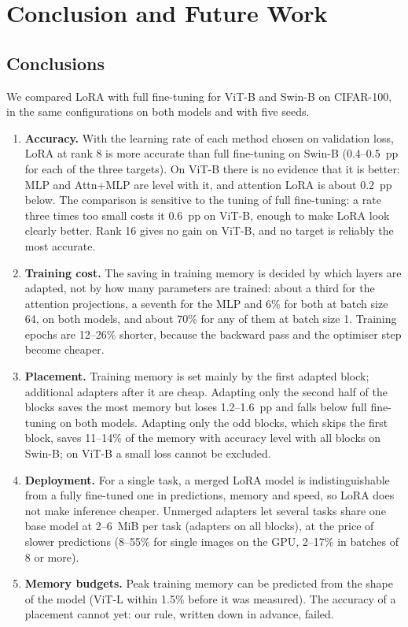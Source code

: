 \chapter{Conclusion and Future Work}
\label{ch:conclusion}

\section{Conclusions}

We compared LoRA with full fine-tuning for ViT-B and Swin-B on CIFAR-100, in the same configurations on both models
and with five seeds.

\begin{enumerate}
  \item \textbf{Accuracy.} With the learning rate of each method chosen on validation loss, LoRA at rank 8 is more
        accurate than full fine-tuning on Swin-B (0.4--0.5~pp for each of the three targets). On ViT-B there is no
        evidence that it is better: MLP and Attn+MLP are level with it, and attention LoRA is about 0.2~pp below. The comparison is sensitive to the tuning of full fine-tuning: a
        rate three times too small costs it 0.6~pp on ViT-B, enough to make LoRA look clearly better. Rank 16 gives
        no gain on ViT-B, and no target is reliably the most accurate.
  \item \textbf{Training cost.} The saving in training memory is decided by which layers are adapted, not by how
        many parameters are trained: about a third for the attention projections, a seventh for the MLP and 6\% for
        both at batch size 64, on both models, and about 70\% for any of them at batch size 1. Training epochs are
        12--26\% shorter, because the backward pass and the optimiser step become cheaper.
  \item \textbf{Placement.} Training memory is set mainly by the first adapted block; additional adapters after it
        are cheap. Adapting only the second half of the blocks saves the most memory but loses 1.2--1.6~pp and falls
        below full fine-tuning on both models. Adapting only the odd blocks, which skips the first block, saves 11--14\% of the memory with
        accuracy level with all blocks on Swin-B; on ViT-B a small loss cannot be excluded.
  \item \textbf{Deployment.} For a single task, a merged LoRA model is indistinguishable from a fully fine-tuned
        one in predictions, memory and speed, so LoRA does not make inference cheaper. Unmerged adapters let
        several tasks share one base model at 2--6~MiB per task (adapters on all blocks), at the price of slower predictions (8--55\% for
        single images on the GPU, 2--17\% in batches of 8 or more).
  \item \textbf{Memory budgets.} Peak training memory can be predicted from the shape of the model (ViT-L within
        1.5\% before it was measured). The accuracy of a placement cannot yet: our rule, written down in advance,
        failed.
\end{enumerate}
